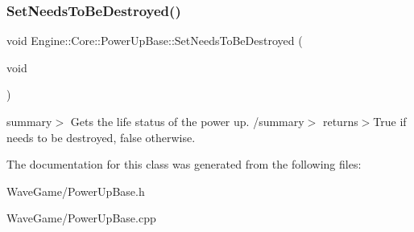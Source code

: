 \subsubsection{\texorpdfstring{Set\+Needs\+To\+Be\+Destroyed()}{SetNeedsToBeDestroyed()}}
{\footnotesize\ttfamily void Engine\+::\+Core\+::\+Power\+Up\+Base\+::\+Set\+Needs\+To\+Be\+Destroyed (\begin{DoxyParamCaption}\item[{void}]{ }\end{DoxyParamCaption})}

summary$>$ Gets the life status of the power up. /summary$>$ returns$>$True if needs to be destroyed, false otherwise.

The documentation for this class was generated from the following files\+:\begin{DoxyCompactItemize}
\item 
Wave\+Game/Power\+Up\+Base.\+h\item 
Wave\+Game/Power\+Up\+Base.\+cpp\end{DoxyCompactItemize}

